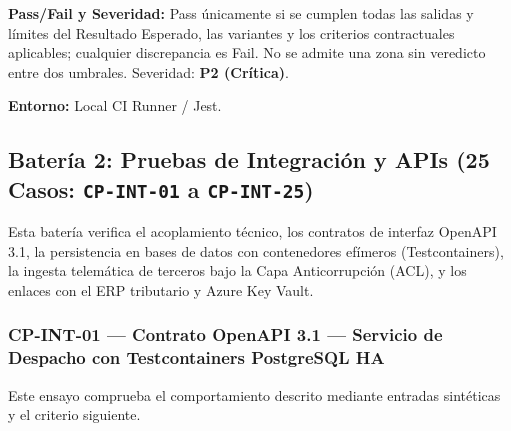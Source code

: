\par\noindent\textbf{Pass/Fail y Severidad:} Pass únicamente si se cumplen todas las salidas y límites del Resultado Esperado, las variantes y los criterios contractuales aplicables; cualquier discrepancia es Fail. No se admite una zona sin veredicto entre dos umbrales. Severidad: \textbf{P2 (Crítica)}.\par
\par\noindent\textbf{Entorno:} Local CI Runner / Jest.\par


\subsection*{Batería 2: Pruebas de Integración y APIs (25 Casos: \texttt{C\allowbreak{}P\allowbreak{}-\allowbreak{}I\allowbreak{}N\allowbreak{}T\allowbreak{}-\allowbreak{}0\allowbreak{}1\allowbreak{}} a \texttt{C\allowbreak{}P\allowbreak{}-\allowbreak{}I\allowbreak{}N\allowbreak{}T\allowbreak{}-\allowbreak{}2\allowbreak{}5\allowbreak{}})}

Esta batería verifica el acoplamiento técnico, los contratos de interfaz OpenAPI 3.1, la persistencia en bases de datos con contenedores efímeros (Testcontainers), la ingesta telemática de terceros bajo la Capa Anticorrupción (ACL), y los enlaces con el ERP tributario y Azure Key Vault.\par






\subsubsection*{CP-INT-01 — Contrato OpenAPI 3.1 — Servicio de Despacho con Testcontainers PostgreSQL HA}\label{sec:9-cp-int-01}
Este ensayo comprueba el comportamiento descrito mediante entradas sintéticas y el criterio siguiente.

